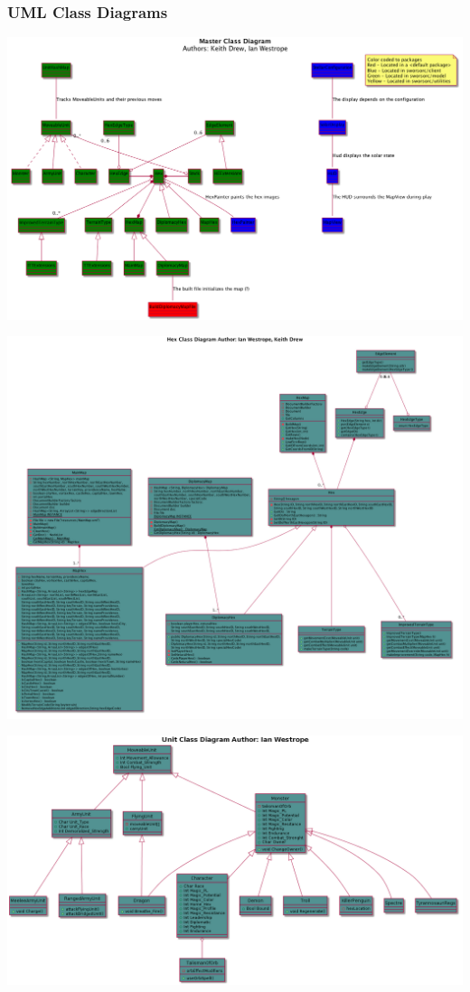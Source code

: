 \documentclass[12pt,a4paper,titlepage]{article}
\begin{document}
\subsubsection{UML Class Diagrams}
\begin{center}
\includegraphics[width=\linewidth]{classDiagram.png}
\end{center}
\begin{center}
\includegraphics[width=\linewidth]{hex.png}
\end{center}
\begin{center}
\includegraphics[width=\linewidth]{units.png}
\end{center}
\end{document}
